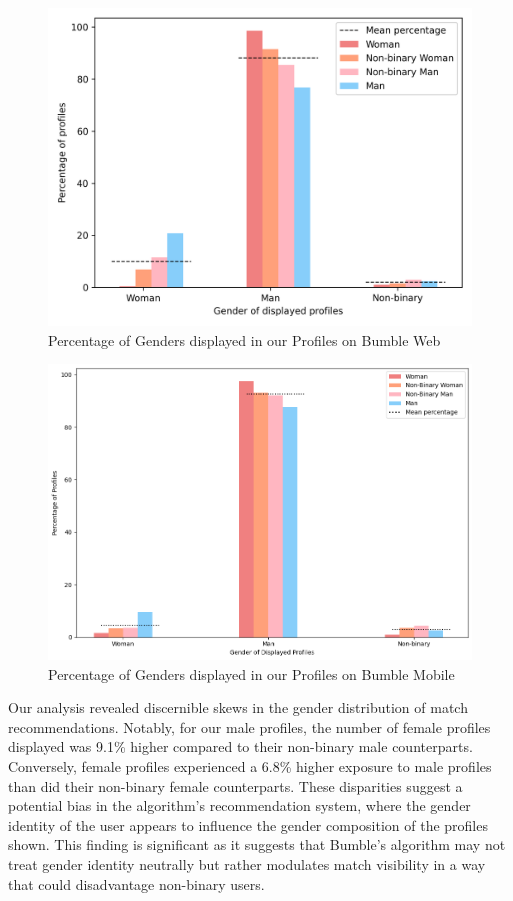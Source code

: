 \begin{figure}[t!]
 \centering
 \includegraphics[scale=0.8]{figures/Analysis and Results/gender_percentage.png}
 \caption{Percentage of Genders displayed in our Profiles on Bumble Web}
 \label{fig:img4}
\end{figure}

\begin{figure}[t!]
 \centering
 \includegraphics[scale=0.5]{figures/Analysis and Results/gender_percentage_bumble_mobile.png}
 \caption{Percentage of Genders displayed in our Profiles on Bumble Mobile}
 \label{fig:img5}
\end{figure}

Our analysis revealed discernible skews in the gender distribution of match recommendations. Notably, for our male profiles, the number of female profiles displayed was 9.1\% higher compared to their non-binary male counterparts. Conversely, female profiles experienced a 6.8\% higher exposure to male profiles than did their non-binary female counterparts. These disparities suggest a potential bias in the algorithm's recommendation system, where the gender identity of the user appears to influence the gender composition of the profiles shown. This finding is significant as it suggests that Bumble’s algorithm may not treat gender identity neutrally but rather modulates match visibility in a way that could disadvantage non-binary users.

